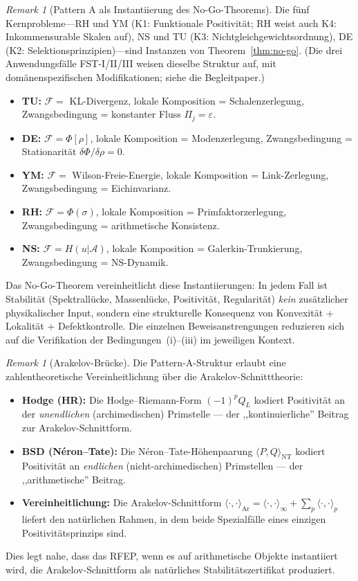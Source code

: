 \documentclass[12pt,a4paper]{article}
\theoremstyle{definition}
\theoremstyle{remark}
\newtheorem{remark}[theorem]{Remark}
\begin{document}
\begin{remark}[Pattern A als Instantiierung des No-Go-Theorems]
Die fünf Kernprobleme---RH und YM (K1: Funktionale Positivität; RH weist auch K4: Inkommensurable Skalen auf), NS und TU (K3: Nichtgleichgewichtsordnung), DE (K2: Selektionsprinzipien)---sind Instanzen von
Theorem~\ref{thm:no-go}. (Die drei Anwendungsfälle FST-I/II/III weisen
dieselbe Struktur auf, mit domänenspezifischen Modifikationen; siehe die Begleitpaper.)
\begin{itemize}
  \item \textbf{TU:} $\mathcal{F} = $ KL-Divergenz,
    lokale Komposition = Schalenzerlegung,
    Zwangsbedingung = konstanter Fluss $\Pi_j = \varepsilon$.
  \item \textbf{DE:} $\mathcal{F} = \Phi[\rho]$,
    lokale Komposition = Modenzerlegung,
    Zwangsbedingung = Stationarität $\delta\Phi/\delta\rho = 0$.
  \item \textbf{YM:} $\mathcal{F} = $ Wilson-Freie-Energie,
    lokale Komposition = Link-Zerlegung,
    Zwangsbedingung = Eichinvarianz.
  \item \textbf{RH:} $\mathcal{F} = \Phi(\sigma)$,
    lokale Komposition = Primfaktorzerlegung,
    Zwangsbedingung = arithmetische Konsistenz.
  \item \textbf{NS:} $\mathcal{F} = H(u|\mathcal{A})$,
    lokale Komposition = Galerkin-Trunkierung,
    Zwangsbedingung = NS-Dynamik.
\end{itemize}
Das No-Go-Theorem vereinheitlicht diese Instantiierungen: In jedem Fall ist
Stabilität (Spektrallücke, Massenlücke, Positivität, Regularität)
\emph{kein} zusätzlicher physikalischer Input, sondern eine strukturelle
Konsequenz von Konvexität + Lokalität + Defektkontrolle. Die einzelnen
Beweisanstrengungen reduzieren sich auf die Verifikation der
Bedingungen~(i)--(iii) im jeweiligen Kontext.
\end{remark}

\begin{remark}[Arakelov-Brücke]
\label{rem:arakelov-bridge}
Die Pattern-A-Struktur erlaubt eine zahlentheoretische Vereinheitlichung über die Arakelov-Schnitttheorie:
\begin{itemize}
\item \textbf{Hodge (HR):} Die Hodge--Riemann-Form $(-1)^p Q_L$ kodiert Positivität an der \emph{unendlichen} (archimedischen) Primstelle --- der ,,kontinuierliche'' Beitrag zur Arakelov-Schnittform.
\item \textbf{BSD (N\'eron--Tate):} Die N\'eron--Tate-Höhenpaarung $\langle P, Q \rangle_{\mathrm{NT}}$ kodiert Positivität an \emph{endlichen} (nicht-archimedischen) Primstellen --- der ,,arithmetische'' Beitrag.
\item \textbf{Vereinheitlichung:} Die Arakelov-Schnittform $\langle \cdot, \cdot \rangle_{\mathrm{Ar}} = \langle \cdot, \cdot \rangle_{\infty} + \sum_p \langle \cdot, \cdot \rangle_p$ liefert den natürlichen Rahmen, in dem beide Spezialfälle eines einzigen Positivitätsprinzips sind.
\end{itemize}
Dies legt nahe, dass das RFEP, wenn es auf arithmetische Objekte instantiiert wird, die Arakelov-Schnittform als natürliches Stabilitätszertifikat produziert.
\end{remark}
\end{document}
